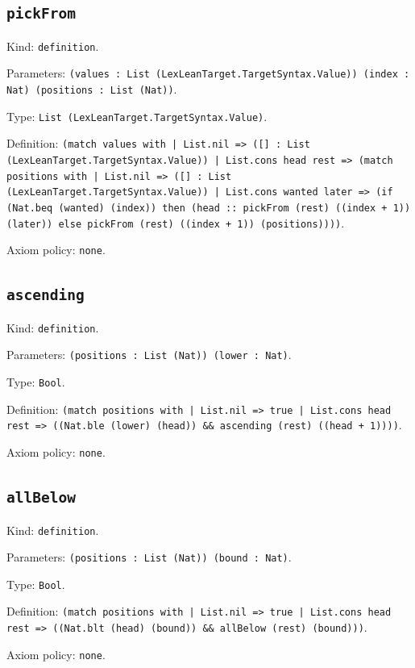 \documentclass[11pt]{article}
\begin{document}
\subsection*{\texttt{pickFrom}}
\noindent Kind: \texttt{definition}.\par
\noindent Parameters: \texttt{(values : List (LexLeanTarget.TargetSyntax.Value)) (index : Nat) (positions : List (Nat))}.\par
\noindent Type: \texttt{List (LexLeanTarget.TargetSyntax.Value)}.\par
\noindent Definition: \texttt{(match values with | List.nil => ([] : List (LexLeanTarget.TargetSyntax.Value)) | List.cons head rest => (match positions with | List.nil => ([] : List (LexLeanTarget.TargetSyntax.Value)) | List.cons wanted later => (if (Nat.beq (wanted) (index)) then (head :: pickFrom (rest) ((index + 1)) (later)) else pickFrom (rest) ((index + 1)) (positions))))}.\par
\noindent Axiom policy: \texttt{none}.\par
\subsection*{\texttt{ascending}}
\noindent Kind: \texttt{definition}.\par
\noindent Parameters: \texttt{(positions : List (Nat)) (lower : Nat)}.\par
\noindent Type: \texttt{Bool}.\par
\noindent Definition: \texttt{(match positions with | List.nil => true | List.cons head rest => ((Nat.ble (lower) (head)) \&\& ascending (rest) ((head + 1))))}.\par
\noindent Axiom policy: \texttt{none}.\par
\subsection*{\texttt{allBelow}}
\noindent Kind: \texttt{definition}.\par
\noindent Parameters: \texttt{(positions : List (Nat)) (bound : Nat)}.\par
\noindent Type: \texttt{Bool}.\par
\noindent Definition: \texttt{(match positions with | List.nil => true | List.cons head rest => ((Nat.blt (head) (bound)) \&\& allBelow (rest) (bound)))}.\par
\noindent Axiom policy: \texttt{none}.\par
\end{document}
